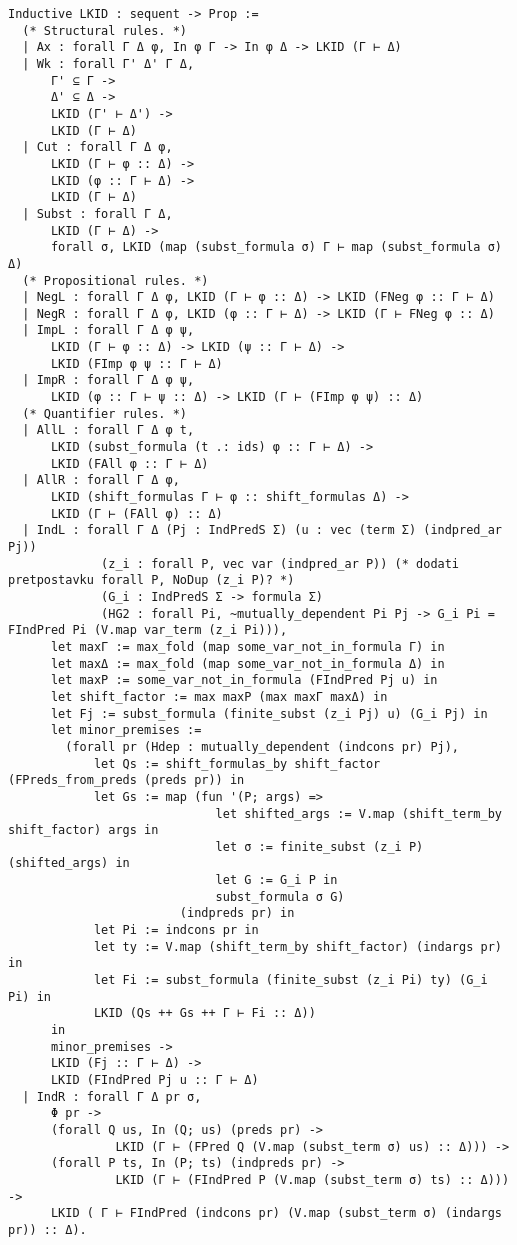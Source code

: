 \begin{verbatim}
Inductive LKID : sequent -> Prop := 
  (* Structural rules. *)
  | Ax : forall Γ Δ φ, In φ Γ -> In φ Δ -> LKID (Γ ⊢ Δ)
  | Wk : forall Γ' Δ' Γ Δ,
      Γ' ⊆ Γ ->
      Δ' ⊆ Δ ->
      LKID (Γ' ⊢ Δ') ->
      LKID (Γ ⊢ Δ)
  | Cut : forall Γ Δ φ,
      LKID (Γ ⊢ φ :: Δ) ->
      LKID (φ :: Γ ⊢ Δ) ->
      LKID (Γ ⊢ Δ)
  | Subst : forall Γ Δ,
      LKID (Γ ⊢ Δ) ->
      forall σ, LKID (map (subst_formula σ) Γ ⊢ map (subst_formula σ) Δ)
  (* Propositional rules. *)
  | NegL : forall Γ Δ φ, LKID (Γ ⊢ φ :: Δ) -> LKID (FNeg φ :: Γ ⊢ Δ)
  | NegR : forall Γ Δ φ, LKID (φ :: Γ ⊢ Δ) -> LKID (Γ ⊢ FNeg φ :: Δ)
  | ImpL : forall Γ Δ φ ψ,
      LKID (Γ ⊢ φ :: Δ) -> LKID (ψ :: Γ ⊢ Δ) ->
      LKID (FImp φ ψ :: Γ ⊢ Δ)
  | ImpR : forall Γ Δ φ ψ,
      LKID (φ :: Γ ⊢ ψ :: Δ) -> LKID (Γ ⊢ (FImp φ ψ) :: Δ)
  (* Quantifier rules. *)
  | AllL : forall Γ Δ φ t,
      LKID (subst_formula (t .: ids) φ :: Γ ⊢ Δ) -> 
      LKID (FAll φ :: Γ ⊢ Δ)
  | AllR : forall Γ Δ φ,
      LKID (shift_formulas Γ ⊢ φ :: shift_formulas Δ) ->
      LKID (Γ ⊢ (FAll φ) :: Δ)
  | IndL : forall Γ Δ (Pj : IndPredS Σ) (u : vec (term Σ) (indpred_ar Pj))
             (z_i : forall P, vec var (indpred_ar P)) (* dodati pretpostavku forall P, NoDup (z_i P)? *)
             (G_i : IndPredS Σ -> formula Σ)
             (HG2 : forall Pi, ~mutually_dependent Pi Pj -> G_i Pi = FIndPred Pi (V.map var_term (z_i Pi))),
      let maxΓ := max_fold (map some_var_not_in_formula Γ) in
      let maxΔ := max_fold (map some_var_not_in_formula Δ) in
      let maxP := some_var_not_in_formula (FIndPred Pj u) in
      let shift_factor := max maxP (max maxΓ maxΔ) in
      let Fj := subst_formula (finite_subst (z_i Pj) u) (G_i Pj) in
      let minor_premises :=
        (forall pr (Hdep : mutually_dependent (indcons pr) Pj),
            let Qs := shift_formulas_by shift_factor (FPreds_from_preds (preds pr)) in
            let Gs := map (fun '(P; args) =>
                             let shifted_args := V.map (shift_term_by shift_factor) args in
                             let σ := finite_subst (z_i P) (shifted_args) in
                             let G := G_i P in
                             subst_formula σ G)
                        (indpreds pr) in
            let Pi := indcons pr in
            let ty := V.map (shift_term_by shift_factor) (indargs pr) in
            let Fi := subst_formula (finite_subst (z_i Pi) ty) (G_i Pi) in
            LKID (Qs ++ Gs ++ Γ ⊢ Fi :: Δ))
      in
      minor_premises ->
      LKID (Fj :: Γ ⊢ Δ) ->
      LKID (FIndPred Pj u :: Γ ⊢ Δ)
  | IndR : forall Γ Δ pr σ,
      Φ pr ->
      (forall Q us, In (Q; us) (preds pr) ->
               LKID (Γ ⊢ (FPred Q (V.map (subst_term σ) us) :: Δ))) ->
      (forall P ts, In (P; ts) (indpreds pr) ->
               LKID (Γ ⊢ (FIndPred P (V.map (subst_term σ) ts) :: Δ))) ->
      LKID ( Γ ⊢ FIndPred (indcons pr) (V.map (subst_term σ) (indargs pr)) :: Δ).
\end{verbatim}

